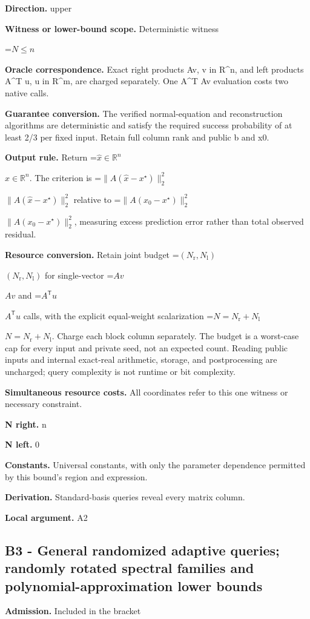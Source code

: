 \documentclass[10pt,a4paper]{article}
\newcommand{\AtlasMath}[1]{\par\begingroup\centering\setbox0=\hbox{$\displaystyle #1$}\ifdim\wd0>1.4\linewidth\typeout{ATLAS WIDE FORMULA: \the\wd0}\fi\ifdim\wd0>\linewidth\resizebox{\linewidth}{!}{\box0}\else\box0\fi\par\endgroup}
\newcommand{\AtlasInlineMath}[1]{\begingroup\setbox0=\hbox{$#1$}\ifdim\wd0>.4\linewidth\endgroup\AtlasMath{#1}\else\endgroup$#1$\fi}
\begin{document}
\textbf{Direction.} upper

\textbf{Witness or lower-bound scope.} Deterministic witness

\AtlasMath{N\le n}
\textbf{Oracle correspondence.} Exact right products Av, v in R\textasciicircum{}n, and left products A\textasciicircum{}T u, u in R\textasciicircum{}m, are charged separately. One A\textasciicircum{}T Av evaluation costs two native calls.

\textbf{Guarantee conversion.} The verified normal-equation and reconstruction algorithms are deterministic and satisfy the required success probability of at least 2/3 per fixed input. Retain full column rank and public b and x0.

\textbf{Output rule.} Return \AtlasInlineMath{\widehat x\in\mathbb R^n}. The criterion is \AtlasInlineMath{\|A(\widehat x-x^\star)\|_2^2} relative to \AtlasInlineMath{\|A(x_0-x^\star)\|_2^2}, measuring excess prediction error rather than total observed residual.

\textbf{Resource conversion.} Retain joint budget \AtlasInlineMath{(N_{\mathrm r},N_{\mathrm l})} for single-vector \AtlasInlineMath{Av} and \AtlasInlineMath{A^{\mathsf T}u} calls, with the explicit equal-weight scalarization \AtlasInlineMath{N=N_{\mathrm r}+N_{\mathrm l}}. Charge each block column separately. The budget is a worst-case cap for every input and private seed, not an expected count. Reading public inputs and internal exact-real arithmetic, storage, and postprocessing are uncharged; query complexity is not runtime or bit complexity.

\textbf{Simultaneous resource costs.} All coordinates refer to this one witness or necessary constraint.

\textbf{N right.} n

\textbf{N left.} 0

\textbf{Constants.} Universal constants, with only the parameter dependence permitted by this bound’s region and expression.

\textbf{Derivation.} Standard-basis queries reveal every matrix column.

\textbf{Local argument.} A2

\subsection{B3 - General randomized adaptive queries; randomly rotated spectral families and polynomial-approximation lower bounds}
\textbf{Admission.} Included in the bracket
\end{document}
